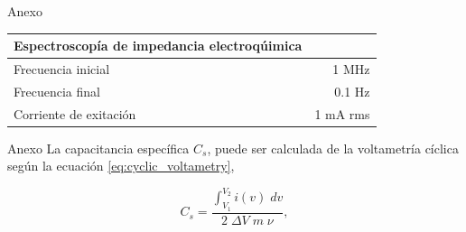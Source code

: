 \documentclass[aspectratio=169]{beamer}
\begin{document}
	\begin{frame}{Anexo}
		\begin{table}[h!]
			\begin{tabular}{ l r }
				Espectroscopía de impedancia electroqúimica & \\
				\hline
				Frecuencia inicial	&	1 MHz \\
				Frecuencia final	&	0.1 Hz \\
				Corriente de exitación & 1 mA rms \\ 
			\end{tabular}
		\end{table}
	\end{frame}	
	
	\begin{frame}{Anexo}
		La capacitancia específica $C_s$, puede ser calculada de la voltametría cíclica según la ecuación \ref{eq:cyclic_voltametry},
		
		\begin{equation}\label{eq:cyclic_voltametry}
		C_{s} = \frac{\int_{V_1}^{V_2}i(v) \; dv}{2 \; \Delta V \; m \; \nu },
		\end{equation}
	\end{frame}
\end{document}

